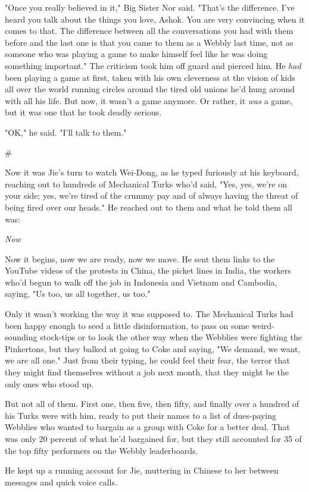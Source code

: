 "Once you really believed in it," Big Sister Nor said. "That's the
difference. I've heard you talk about the things you love, Ashok.
You are very convincing when it comes to that. The difference
between all the conversations you had with them before and the last
one is that you came to them as a Webbly last time, not as someone
who was playing a game to make himself feel like he was doing
something important." The criticism took him off guard and pierced
him. He \emph{had} been playing a game at first, taken with his own
cleverness at the vision of kids all over the world running circles
around the tired old unions he'd hung around with all his life. But
now, it wasn't a game anymore. Or rather, it \emph{was} a game, but
it was one that he took deadly serious.

"OK," he said. "I'll talk to them."

\#

Now it was Jie's turn to watch Wei-Dong, as he typed furiously at
his keyboard, reaching out to hundreds of Mechanical Turks who'd
said, "Yes, yes, we're on your side; yes, we're tired of the crummy
pay and of always having the threat of being fired over our heads."
He reached out to them and what he told them all was:

\emph{Now}

Now it begins, now we are ready, now we move. He sent them links to
the YouTube videos of the protests in China, the picket lines in
India, the workers who'd begun to walk off the job in Indonesia and
Vietnam and Cambodia, saying, "Us too, us all together, us too."

Only it wasn't working the way it was supposed to. The Mechanical
Turks had been happy enough to seed a little disinformation, to
pass on some weird-sounding stock-tips or to look the other way
when the Webblies were fighting the Pinkertons, but they balked at
going to Coke and saying, "We demand, we want, we are all one."
Just from their typing, he could feel their fear, the terror that
they might find themselves without a job next month, that they
might be the only ones who stood up.

But not all of them. First one, then five, then fifty, and finally
over a hundred of his Turks were with him, ready to put their names
to a list of dues-paying Webblies who wanted to bargain as a group
with Coke for a better deal. That was only 20 percent of what he'd
bargained for, but they still accounted for 35 of the top fifty
performers on the Webbly leaderboards.

He kept up a running account for Jie, muttering in Chinese to her
between messages and quick voice calls.

